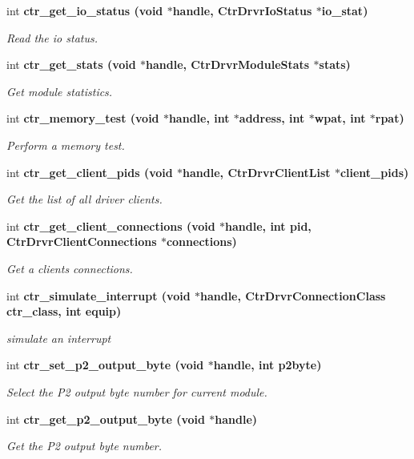 \begin{CompactItemize}
int \bf{ctr\_\-get\_\-io\_\-status} (void $\ast$handle, Ctr\-Drvr\-Io\-Status $\ast$io\_\-stat)
\begin{CompactList}\small\item\em Read the io status. \item\end{CompactList}\item 
int \bf{ctr\_\-get\_\-stats} (void $\ast$handle, Ctr\-Drvr\-Module\-Stats $\ast$stats)
\begin{CompactList}\small\item\em Get module statistics. \item\end{CompactList}\item 
int \bf{ctr\_\-memory\_\-test} (void $\ast$handle, int $\ast$address, int $\ast$wpat, int $\ast$rpat)
\begin{CompactList}\small\item\em Perform a memory test. \item\end{CompactList}\item 
int \bf{ctr\_\-get\_\-client\_\-pids} (void $\ast$handle, Ctr\-Drvr\-Client\-List $\ast$client\_\-pids)
\begin{CompactList}\small\item\em Get the list of all driver clients. \item\end{CompactList}\item 
int \bf{ctr\_\-get\_\-client\_\-connections} (void $\ast$handle, int pid, Ctr\-Drvr\-Client\-Connections $\ast$connections)
\begin{CompactList}\small\item\em Get a clients connections. \item\end{CompactList}\item 
int \bf{ctr\_\-simulate\_\-interrupt} (void $\ast$handle, Ctr\-Drvr\-Connection\-Class ctr\_\-class, int equip)
\begin{CompactList}\small\item\em simulate an interrupt \item\end{CompactList}\item 
int \bf{ctr\_\-set\_\-p2\_\-output\_\-byte} (void $\ast$handle, int p2byte)
\begin{CompactList}\small\item\em Select the P2 output byte number for current module. \item\end{CompactList}\item 
int \bf{ctr\_\-get\_\-p2\_\-output\_\-byte} (void $\ast$handle)
\begin{CompactList}\small\item\em Get the P2 output byte number. \item\end{CompactList}\end{CompactItemize}



